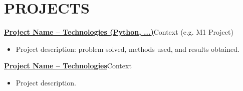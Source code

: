 \section{PROJECTS}
\resumeSubHeadingListStart

\resumeProjectHeading
  {\textbf{\href{https://github.com/username/project}{Project Name -- Technologies (Python, ...)}}}{Context (e.g. M1 Project)}
  \begin{itemize}[leftmargin=0.12in, label={}, itemsep=0pt]
    \item \small Project description: problem solved, methods used, and results obtained.
  \end{itemize}

\vspace{-3pt}

\resumeProjectHeading
  {\textbf{\href{https://github.com/username/project}{Project Name -- Technologies}}}{Context}
  \begin{itemize}[leftmargin=0.12in, label={}, itemsep=0pt]
    \item \small Project description.
  \end{itemize}

\resumeSubHeadingListEnd
